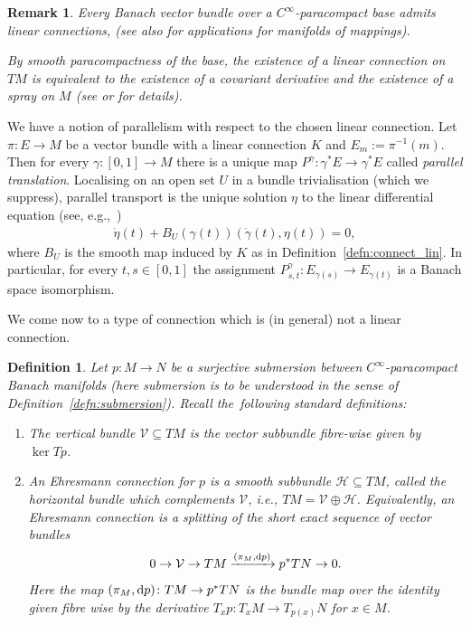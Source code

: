 \documentclass[11pt]{article}
\numberwithin{equation}{section}
\numberwithin{equation}{section}
\newtheorem{Definition}[Theorem]{Definition}
\newtheorem{setup}[Theorem]{}
\newtheorem{Remark}[Theorem]{Remark} }
\newcommand{\cV}{\ensuremath{\mathcal{V}}}
\begin{document}
\begin{Remark}\label{rem:ex_lincon}
Every Banach vector bundle over a $C^\infty$-paracompact base admits linear connections, \cite[Theorem 1.5.15]{Kli95} (see also \cite{Eli67} for applications for manifolds of mappings).

By smooth paracompactness of the base, the existence of a linear connection on $TM$ is equivalent to the existence of a covariant derivative and the existence of a spray on $M$ (see \mbox{\cite[Section VIII]{La01}} or \cite[Section 1.5]{Kli95} for details).
\end{Remark}

We have a notion of parallelism with respect to the chosen linear connection.
\label{setup:parallel_tp}
Let $\pi \colon E \rightarrow M$ be a vector bundle with a linear connection $K$ and $E_m := \pi^{-1}(m)$.
Then for every $\gamma \colon [0,1] \rightarrow M$ there is a unique map $P^\gamma\colon \gamma^\ast E \rightarrow \gamma^\ast E$ called \emph{parallel translation}.
Localising on an open set $U$ in a bundle trivialisation (which we suppress), parallel transport is the unique solution $\eta$ to the linear differential equation (see, e.g.,~\mbox{\cite[Lemma~1.6.14]{Kli95}})
\begin{align}\label{eq:PT_diffeo}
\dot{\eta}(t) + B_U (\gamma(t)) (\dot{\gamma}(t),\eta(t))=0,
\end{align}
where $B_U$ is the smooth map induced by $K$ as in Definition~\ref{defn:connect_lin}.
In particular, for every $t,s \in [0,1]$ the assignment
$P_{s,t}^\gamma \colon E_{\gamma (s)} \rightarrow E_{\gamma (t)}$
is a Banach space isomorphism.

We come now to a type of connection which is (in general) not a linear connection.

\begin{Definition}
Let $p \colon M \rightarrow N$ be a surjective submersion between $C^\infty$-paracompact Banach manifolds (here submersion is to be understood in the sense of Definition~\ref{defn:submersion}). Recall the~following standard definitions:
\begin{enumerate}\itemsep=0pt
\item The \emph{vertical bundle} $\mathcal{V} \subseteq TM$ is the vector subbundle fibre-wise given by $\ker T p$.
\item An \emph{Ehresmann connection} for $p$ is a smooth subbundle $\mathcal{H} \subseteq TM$, called the \emph{horizontal bundle} which complements $\cV$, i.e., $TM=\mathcal{V} \oplus \mathcal{H}$.
Equivalently, an Ehresmann connection is a splitting of the short exact sequence of vector bundles
\begin{displaymath}0 \rightarrow \cV \rightarrow TM \xrightarrow{(\pi_M,{\rm d}p)} p^{\ast}TN \rightarrow 0.\end{displaymath}
Here the map $(\pi_M,{\rm d}p) \colon TM \rightarrow p^\ast TN$ is the bundle map over the identity given fibre wise by the derivative $T_xp \colon T_x M \rightarrow T_{p(x)}N$ for $x\in M$.
\end{enumerate}
\end{Definition}
\end{document}
